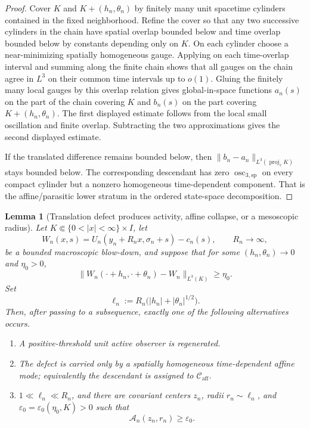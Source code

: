 \documentclass[11pt]{amsart}
\numberwithin{equation}{section}
\theoremstyle{plain}
\newtheorem{lemma}[theorem]{Lemma}
\theoremstyle{definition}
\theoremstyle{remark}
\newcommand{\Caff}{\mathcal C_{\mathrm{aff}}}
\newcommand{\oscsp}{\operatorname{osc}_{3,\mathrm{sp}}}
\begin{document}
\begin{proof}
Cover \(K\) and \(K+(h_n,\theta_n)\) by finitely many unit spacetime cylinders
contained in the fixed neighborhood.  Refine the cover so that any two
successive cylinders in the chain have spatial overlap bounded below and time
overlap bounded below by constants depending only on \(K\).  On each cylinder
choose a near-minimizing spatially homogeneous gauge.  Applying
 on each time-overlap interval and
summing along the finite chain shows that all gauges on the chain agree in
\(L^3\) on their common time intervals up to \(o(1)\).  Gluing the finitely many
local gauges by this overlap relation gives global-in-space functions
\(a_n(s)\) on the part of the chain covering \(K\) and \(b_n(s)\) on the part
covering \(K+(h_n,\theta_n)\).  The first displayed estimate follows from the
local small oscillation and finite overlap.  Subtracting the two approximations
gives the second displayed estimate.

If the translated difference remains bounded below, then
\(\|b_n-a_n\|_{L^3(\operatorname{proj}_sK)}\) stays bounded below.  The
corresponding descendant has zero \(\oscsp\) on every compact cylinder but a
nonzero homogeneous time-dependent component.
That is the affine/parasitic lower stratum in the ordered state-space
decomposition.
\end{proof}

\begin{lemma}[Translation defect produces activity, affine collapse, or a mesoscopic radius]
\label{lem:translation-defect-to-bad-radius}
Let \(K\Subset\{0<|x|<\infty\}\times I\), let
\[
   W_n(x,s)=U_n(y_n+R_nx,\sigma_n+s)-c_n(s),
   \qquad R_n\to\infty,
\]
be a bounded macroscopic blow-down, and suppose that for some
\((h_n,\theta_n)\to0\) and \(\eta_0>0\),
\[
   \|W_n(\cdot+h_n,\cdot+\theta_n)-W_n\|_{L^3(K)}\ge\eta_0 .
\]
Set
\[
   \ell_n:=R_n\bigl(|h_n|+|\theta_n|^{1/2}\bigr).
\]
Then, after passing to a subsequence, exactly one of the following alternatives
occurs.
\begin{enumerate}[label=\textup{(\roman*)}]
   \item A positive-threshold unit active observer is regenerated.
   \item The defect is carried only by a spatially homogeneous time-dependent
   affine mode; equivalently the descendant is assigned to \(\Caff\).
   \item \(1\ll\ell_n\ll R_n\), and there are covariant centers \(z_n\), radii
   \(r_n\sim\ell_n\), and \(\varepsilon_0=\varepsilon_0(\eta_0,K)>0\) such that
   \[
      \mathcal A_n(z_n,r_n)\ge\varepsilon_0 .
   \]
\end{enumerate}
\end{lemma}
\end{document}
